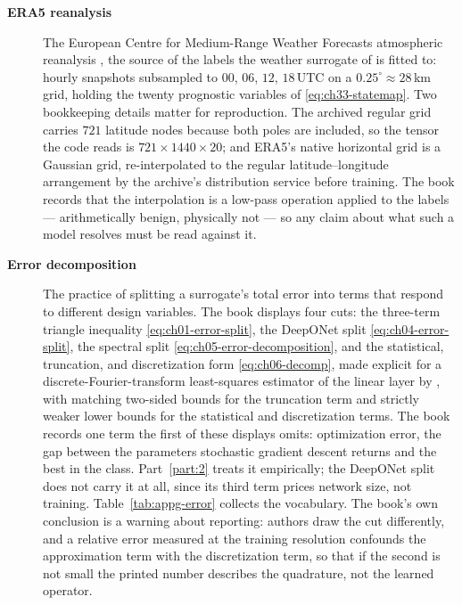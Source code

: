 \begin{description}
\item[\textbf{ERA5 reanalysis}] The European Centre for Medium-Range Weather
Forecasts atmospheric reanalysis \cite{hersbach2020era5}, the source of the labels the
weather surrogate of 
is fitted to: hourly snapshots subsampled to $00$, $06$, $12$, $18$\,UTC on a
$0.25^{\circ} \approx 28$\,km grid, holding the twenty prognostic variables of
\eqref{eq:ch33-statemap}. Two bookkeeping details matter for reproduction. The
archived regular grid carries $721$ latitude nodes because both poles are included,
so the tensor the code reads is $721 \times 1440 \times 20$; and ERA5's native
horizontal grid is a Gaussian grid, re-interpolated to the regular latitude--longitude
arrangement by the archive's distribution service before training. The book records
that the interpolation is a low-pass operation applied to the labels --- arithmetically
benign, physically not --- so any claim about what such a model resolves must be read
against it. 

\item[\textbf{Error decomposition}] The practice of splitting a surrogate's total
error into terms that respond to different design variables. The book displays four
cuts: the three-term triangle inequality \eqref{eq:ch01-error-split}, the DeepONet
split \eqref{eq:ch04-error-split}, the spectral split
\eqref{eq:ch05-error-decomposition}, and the statistical, truncation, and
discretization form \eqref{eq:ch06-decomp}, made explicit for a discrete-Fourier-transform least-squares estimator of the linear
layer by \cite{subedi2024controlling}, with matching two-sided bounds for the truncation
term and strictly weaker lower bounds for the statistical and discretization terms. The book records one term the first of these
displays omits: optimization error, the gap between the parameters stochastic gradient
descent returns and the best in the class. Part~\ref{part:2} treats it empirically; the DeepONet split does not carry it at
all, since its third term prices network size, not training. Table~\ref{tab:appg-error} collects
the vocabulary. The book's own conclusion is a warning about reporting:
authors draw the cut differently, and a relative error measured at the training
resolution confounds the approximation term with the discretization term, so that if the
second is not small the printed number describes the quadrature, not the learned
operator. 


\end{description}
